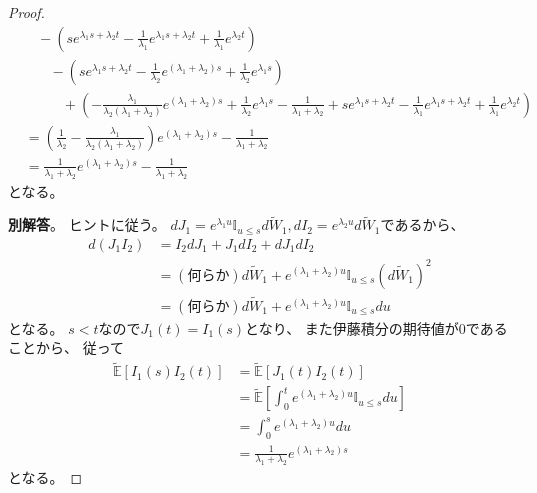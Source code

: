 \documentclass[uplatex]{jsarticle}
\theoremstyle{definition}
\def\E{\mathbb{E}}
\def\I{\mathbb{I}}
\begin{document}
\begin{proof}
\begin{align*}
    &\ \ \ \
    - \left( se^{\lambda_1s+\lambda_2t}
    - \frac{1}{\lambda_1}e^{\lambda_1s+\lambda_2t}
    + \frac{1}{\lambda_1}e^{\lambda_2t} \right) \\
    &\ \ \ \ \ \ \ \
    - \left( se^{\lambda_1s+\lambda_2t}
    - \frac{1}{\lambda_2}e^{(\lambda_1+\lambda_2)s}
    + \frac{1}{\lambda_2}e^{\lambda_1s}\right) \\
    &\ \ \ \ \ \ \ \ \ \ \ \
    + \left( - \frac{\lambda_1}{\lambda_2(\lambda_1+\lambda_2)}e^{(\lambda_1+\lambda_2)s}
    + \frac{1}{\lambda_2}e^{\lambda_1s}
    - \frac{1}{\lambda_1+\lambda_2}
    + se^{\lambda_1s+\lambda_2t}
    - \frac{1}{\lambda_1}e^{\lambda_1s+\lambda_2t}
    + \frac{1}{\lambda_1}e^{\lambda_2t}\right) \\
    &= \left( \frac{1}{\lambda_2} -
    \frac{\lambda_1}{\lambda_2(\lambda_1+\lambda_2)}\right)
    e^{(\lambda_1+\lambda_2)s} - \frac{1}{\lambda_1+\lambda_2} \\
    &= \frac{1}{\lambda_1+\lambda_2}e^{(\lambda_1+\lambda_2)s}
    - \frac{1}{\lambda_1+\lambda_2}
  \end{align*}
  となる。

  \textbf{別解答}。
  ヒントに従う。
  \(dJ_1 = e^{\lambda_1u}\I_{u\leq s}d\tilde{W}_1,
  dI_2 = e^{\lambda_2u}d\tilde{W}_1\)であるから、
  \begin{align*}
    d(J_1I_2)
    &= I_2dJ_1+J_1dI_2+dJ_1dI_2 \\
    &= (\text{何らか})d\tilde{W}_1
    + e^{(\lambda_1+\lambda_2)u}\I_{u\leq s}\left( d\tilde{W}_1\right)^2 \\
    &= (\text{何らか})d\tilde{W}_1
    + e^{(\lambda_1+\lambda_2)u}\I_{u\leq s}du
  \end{align*}
  となる。
  \(s<t\)なので\(J_1(t)=I_1(s)\)となり、
  また伊藤積分の期待値が\(0\)であることから、
  従って
  \begin{align*}
    \tilde{\E}[I_1(s)I_2(t)]
    &= \tilde{\E}[J_1(t)I_2(t)] \\
    &= \tilde{\E}[\int_0^t e^{(\lambda_1+\lambda_2)u}\I_{u\leq s} du] \\
    &= \int_0^s e^{(\lambda_1+\lambda_2)u} du \\
    &= \frac{1}{\lambda_1+\lambda_2}e^{(\lambda_1+\lambda_2)s}
  \end{align*}
  となる。
\end{proof}
\end{document}
